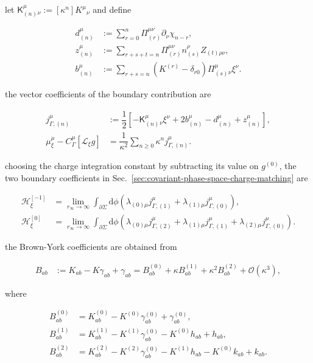 let $\displaystyle{\mathsf{K}_{(n)}^{\mu}{}_{\nu}:=[\kappa ^n]K^{\mu}{}_{\nu}}$ and define

\[\begin{aligned}
d_{(n)}^{\mu} & :=\sum _{r=0}^{n}\Pi _{(r)}^{\mu \nu}\partial _{\nu}\chi _{n-r}, \\
z_{(n)}^{\mu} & :=\sum _{r+s+t=n}\Pi _{(r)}^{\mu \nu}n_{(s)}^{\rho}Z_{(t)\rho \nu}, \\
b_{(n)}^{\mu} & :=\sum _{r+s=n}\left(K^{(r)}-\delta _{r0}\right)\Pi _{(s)}^{\mu}{}_{\nu}\xi ^{\nu}.
\end{aligned}\]

the vector coefficients of the boundary contribution are

\begin{align}
j_{\Gamma,(n)}^{\mu} & :=\dfrac{1}{2}\left[-\mathsf{K}_{(n)}^{\mu}{}_{\nu}\xi ^{\nu}+2b_{(n)}^{\mu}-d_{(n)}^{\mu}+z_{(n)}^{\mu}\right], \\
\mu _{\xi}^{\mu}-C_{\Gamma}^{\mu}[\mathcal{L}_{\xi}g] & =\dfrac{1}{\kappa ^2}\sum _{n\geq0}\kappa ^nj_{\Gamma,(n)}^{\mu}.
\end{align}

choosing the charge integration constant by subtracting its value on $\displaystyle{g^{(0)}}$, the two boundary coefficients in Sec.~\ref{sec:covariant-phase-space-charge-matching} are

\[\begin{aligned}
\mathscr{H}_{\xi}^{[-1]} & =\lim _{r_{\infty}\to\infty}\int _{\partial\Sigma}\mathrm{d}\phi\left(\lambda _{(0)\mu}j_{\Gamma,(1)}^{\mu}+\lambda _{(1)\mu}j_{\Gamma,(0)}^{\mu}\right), \\
\mathscr{H}_{\xi}^{[0]} & =\lim _{r_{\infty}\to\infty}\int _{\partial\Sigma}\mathrm{d}\phi\left(\lambda _{(0)\mu}j_{\Gamma,(2)}^{\mu}+\lambda _{(1)\mu}j_{\Gamma,(1)}^{\mu}+\lambda _{(2)\mu}j_{\Gamma,(0)}^{\mu}\right).
\end{aligned}\]

the Brown-York coefficients are obtained from

\begin{align}
B_{ab} & :=K_{ab}-K\gamma _{ab}+\gamma _{ab}=B_{ab}^{(0)}+\kappa B_{ab}^{(1)}+\kappa ^2B_{ab}^{(2)}+\mathcal{O}(\kappa ^3),
\end{align}

where

\[\begin{aligned}
B_{ab}^{(0)} & =K_{ab}^{(0)}-K^{(0)}\gamma _{ab}^{(0)}+\gamma _{ab}^{(0)}, \\
B_{ab}^{(1)} & =K_{ab}^{(1)}-K^{(1)}\gamma _{ab}^{(0)}-K^{(0)}h_{ab}+h_{ab}, \\
B_{ab}^{(2)} & =K_{ab}^{(2)}-K^{(2)}\gamma _{ab}^{(0)}-K^{(1)}h_{ab}-K^{(0)}k_{ab}+k_{ab}.
\end{aligned}\]

